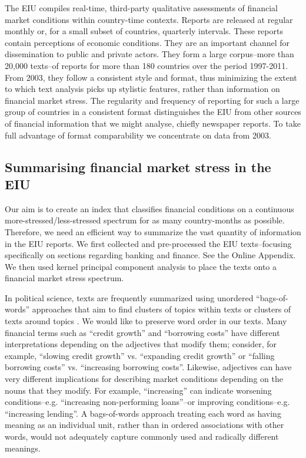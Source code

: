 \documentclass[]{article}
\begin{document}
The EIU compiles real-time, third-party qualitative assessments of financial market conditions within country-time contexts. Reports are released at regular monthly or, for a small subset of countries, quarterly intervals. These reports contain perceptions of economic conditions. They are an important channel for dissemination to public and private actors. They form a large corpus--more than 20,000 texts--of reports for more than 180 countries over the period 1997-2011. From 2003, they follow a consistent style and format, thus minimizing the extent to which text analysis picks up stylistic features, rather than information on financial market stress. The regularity and frequency of reporting for such a large group of countries in a consistent format distinguishes the EIU from other sources of financial information that we might analyse, chiefly newspaper reports. To take full advantage of format comparability we concentrate on data from 2003.

\subsection{Summarising financial market stress in the
EIU}\label{summarizing-financial-market-stress-in-the-eiu}

Our aim is to create an index that classifies financial conditions on a continuous more-stressed/less-stressed spectrum for as many country-months as possible. Therefore, we need an efficient way to summarize the vast quantity of information in the EIU reports. We first collected and pre-processed the EIU texts--focusing specifically on sections regarding banking and finance. See the Online Appendix. We then used kernel principal component analysis to place the texts onto a financial market stress spectrum.

In political science, texts are frequently summarized using unordered ``bags-of-words'' approaches that aim to find clusters of topics within texts or clusters of texts around topics \citep[see][]{Grimmer2013}. We would like to preserve word order in our texts. Many financial terms such as ``credit growth'' and ``borrowing costs'' have different interpretations depending on the adjectives that modify them; consider, for example, ``slowing credit growth'' vs. ``expanding credit growth'' or ``falling borrowing costs'' vs. ``increasing borrowing costs''. Likewise, adjectives can have very different implications for describing market conditions depending on the nouns that they modify. For example, ``increasing'' can indicate worsening conditions--e.g. ``increasing non-performing loans''--or improving conditions--e.g. ``increasing lending''.  A bags-of-words approach treating each word as having meaning as an individual unit, rather than in ordered associations with other words, would not adequately capture commonly used and radically different meanings.
\end{document}

